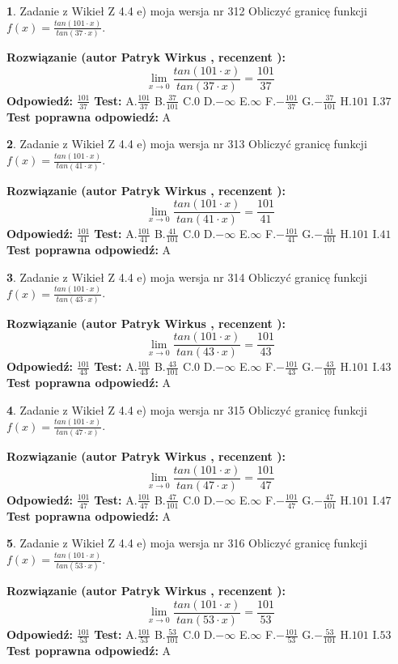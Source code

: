 \documentclass[12pt, a4paper]{article}
\theoremstyle{definition} %
\newtheorem{zad}{}
\newcommand{\zadStart}[1]{\begin{zad}#1\newline}
\newcommand{\zadStop}{\end{zad}}
\newcommand{\rozwStart}[2]{\noindent \textbf{Rozwiązanie (autor #1 , recenzent #2): }\newline}
\newcommand{\rozwStop}{\newline}
\newcommand{\odpStart}{\noindent \textbf{Odpowiedź:}\newline}
\newcommand{\odpStop}{\newline}
\newcommand{\testStart}{\noindent \textbf{Test:}\newline}
\newcommand{\testStop}{\newline}
\newcommand{\kluczStart}{\noindent \textbf{Test poprawna odpowiedź:}\newline}
\newcommand{\kluczStop}{\newline}
\begin{document}
\zadStart{Zadanie z Wikieł Z 4.4 e) moja wersja nr 312}
Obliczyć granicę funkcji $f(x)=\frac{tan(101\cdot x)}{tan(37\cdot x)}$.
\zadStop
\rozwStart{Patryk Wirkus}{}
$$\lim\limits_{x\to 0}\frac{tan(101\cdot x)}{tan(37\cdot x)}=
\frac{101}{37}$$
\rozwStop
\odpStart
$\frac{101}{37}$
\odpStop
\testStart
A.$\frac{101}{37}$
B.$\frac{37}{101}$
C.$0$
D.$-\infty$
E.$\infty$
F.$-\frac{101}{37}$
G.$-\frac{37}{101}$
H.$101$
I.$37$
\testStop
\kluczStart
A
\kluczStop



\zadStart{Zadanie z Wikieł Z 4.4 e) moja wersja nr 313}
Obliczyć granicę funkcji $f(x)=\frac{tan(101\cdot x)}{tan(41\cdot x)}$.
\zadStop
\rozwStart{Patryk Wirkus}{}
$$\lim\limits_{x\to 0}\frac{tan(101\cdot x)}{tan(41\cdot x)}=
\frac{101}{41}$$
\rozwStop
\odpStart
$\frac{101}{41}$
\odpStop
\testStart
A.$\frac{101}{41}$
B.$\frac{41}{101}$
C.$0$
D.$-\infty$
E.$\infty$
F.$-\frac{101}{41}$
G.$-\frac{41}{101}$
H.$101$
I.$41$
\testStop
\kluczStart
A
\kluczStop



\zadStart{Zadanie z Wikieł Z 4.4 e) moja wersja nr 314}
Obliczyć granicę funkcji $f(x)=\frac{tan(101\cdot x)}{tan(43\cdot x)}$.
\zadStop
\rozwStart{Patryk Wirkus}{}
$$\lim\limits_{x\to 0}\frac{tan(101\cdot x)}{tan(43\cdot x)}=
\frac{101}{43}$$
\rozwStop
\odpStart
$\frac{101}{43}$
\odpStop
\testStart
A.$\frac{101}{43}$
B.$\frac{43}{101}$
C.$0$
D.$-\infty$
E.$\infty$
F.$-\frac{101}{43}$
G.$-\frac{43}{101}$
H.$101$
I.$43$
\testStop
\kluczStart
A
\kluczStop



\zadStart{Zadanie z Wikieł Z 4.4 e) moja wersja nr 315}
Obliczyć granicę funkcji $f(x)=\frac{tan(101\cdot x)}{tan(47\cdot x)}$.
\zadStop
\rozwStart{Patryk Wirkus}{}
$$\lim\limits_{x\to 0}\frac{tan(101\cdot x)}{tan(47\cdot x)}=
\frac{101}{47}$$
\rozwStop
\odpStart
$\frac{101}{47}$
\odpStop
\testStart
A.$\frac{101}{47}$
B.$\frac{47}{101}$
C.$0$
D.$-\infty$
E.$\infty$
F.$-\frac{101}{47}$
G.$-\frac{47}{101}$
H.$101$
I.$47$
\testStop
\kluczStart
A
\kluczStop



\zadStart{Zadanie z Wikieł Z 4.4 e) moja wersja nr 316}
Obliczyć granicę funkcji $f(x)=\frac{tan(101\cdot x)}{tan(53\cdot x)}$.
\zadStop
\rozwStart{Patryk Wirkus}{}
$$\lim\limits_{x\to 0}\frac{tan(101\cdot x)}{tan(53\cdot x)}=
\frac{101}{53}$$
\rozwStop
\odpStart
$\frac{101}{53}$
\odpStop
\testStart
A.$\frac{101}{53}$
B.$\frac{53}{101}$
C.$0$
D.$-\infty$
E.$\infty$
F.$-\frac{101}{53}$
G.$-\frac{53}{101}$
H.$101$
I.$53$
\testStop
\kluczStart
A
\kluczStop
\end{document}
